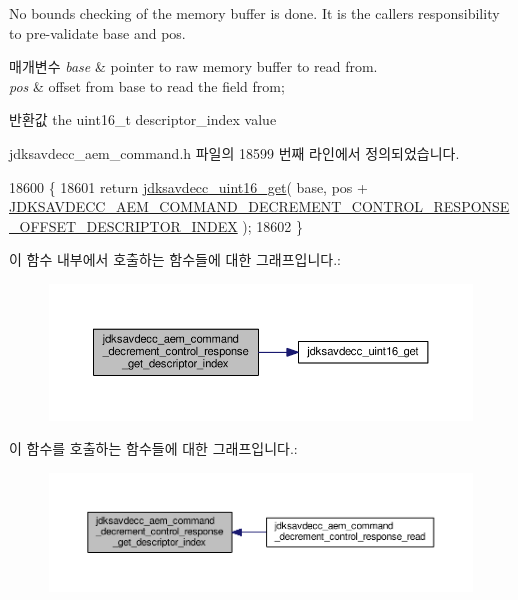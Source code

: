 No bounds checking of the memory buffer is done. It is the caller\textquotesingle{}s responsibility to pre-\/validate base and pos.


\begin{DoxyParams}{매개변수}
{\em base} & pointer to raw memory buffer to read from. \\
\hline
{\em pos} & offset from base to read the field from; \\
\hline
\end{DoxyParams}
\begin{DoxyReturn}{반환값}
the uint16\+\_\+t descriptor\+\_\+index value 
\end{DoxyReturn}


jdksavdecc\+\_\+aem\+\_\+command.\+h 파일의 18599 번째 라인에서 정의되었습니다.


\begin{DoxyCode}
18600 \{
18601     \textcolor{keywordflow}{return} \hyperlink{group__endian_ga3fbbbc20be954aa61e039872965b0dc9}{jdksavdecc\_uint16\_get}( base, pos + 
      \hyperlink{group__command__decrement__control__response_ga144521c3e88ffe93d0c3a801a0ee817c}{JDKSAVDECC\_AEM\_COMMAND\_DECREMENT\_CONTROL\_RESPONSE\_OFFSET\_DESCRIPTOR\_INDEX}
       );
18602 \}
\end{DoxyCode}


이 함수 내부에서 호출하는 함수들에 대한 그래프입니다.\+:
\nopagebreak
\begin{figure}[H]
\begin{center}
\leavevmode
\includegraphics[width=350pt]{group__command__decrement__control__response_gaf62c1fb7ca43cb39a50464afb058f748_cgraph}
\end{center}
\end{figure}




이 함수를 호출하는 함수들에 대한 그래프입니다.\+:
\nopagebreak
\begin{figure}[H]
\begin{center}
\leavevmode
\includegraphics[width=350pt]{group__command__decrement__control__response_gaf62c1fb7ca43cb39a50464afb058f748_icgraph}
\end{center}
\end{figure}


